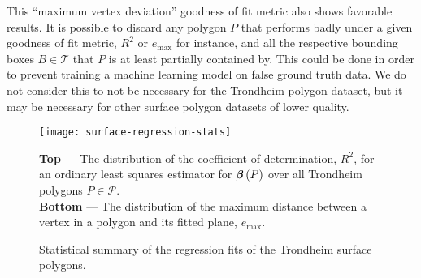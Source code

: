 This \enquote{maximum vertex deviation} goodness of fit metric also shows favorable results.
It is possible to discard any polygon $P$ that performs badly under a given goodness of fit metric, $R^2$ or $e_{\mathrm{max}}$ for instance, and all the respective bounding boxes $B \in \mathcal{T}$ that $P$ is at least partially contained by.
This could be done in order to prevent training a machine learning model on false ground truth data.
We do not consider this to not be necessary for the Trondheim polygon dataset, but it may be necessary for other surface polygon datasets of lower quality.
%
\begin{figure}
  \texttt{[image: surface-regression-stats]}
  \caption{%
    Statistical summary of the regression fits of the Trondheim surface polygons.
  }{%
    \textbf{Top} --- The distribution of the coefficient of determination, $R^2$, for an ordinary least squares estimator for $\boldsymbol{\beta}\left(P\right)$ over all Trondheim polygons $P \in \mathcal{P}$.
    \\
    \textbf{Bottom} --- The distribution of the maximum distance between a vertex in a polygon and its fitted plane, $e_{\mathrm{max}}$.
  }%
  \label{fig:surface-regression-stats}
\end{figure}


